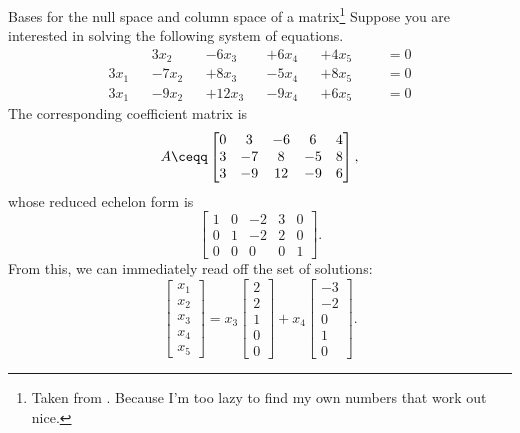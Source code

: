\begin{exm}{Bases for the null space and column space of a matrix}{}\footnote{Taken from \cite{Lay}.  Because I'm too lazy to find my own numbers that work out nice.}
	Suppose you are interested in solving the following system of equations.
	\begin{subequations}\label{eqn2.2.58}
		\begin{align}
		& & 3x_2& & -6x_3& & +6x_4& & +4x_5& & &=0 \\
		3x_1& & -7x_2& & +8x_3& & -5x_4& & +8x_5& & &=0 \\
		3x_1& & -9x_2& & +12x_3& & -9x_4& & +6x_5& & &=0
		\end{align}
	\end{subequations}
	The corresponding coefficient matrix is
	\begin{equation}
	A\ceqq \begin{bmatrix}0 & 3 & -6 & 6 & 4 \\ 3 & -7 & 8 & -5 & 8 \\ 3 & -9 & 12 & -9 & 6\end{bmatrix},
	\end{equation}
	whose reduced echelon form is
	\begin{equation}
	\begin{bmatrix}1 & 0 & -2 & 3 & 0 \\ 0 & 1 & -2 & 2 & 0 \\ 0 & 0 & 0 & 0 & 1 \end{bmatrix}.
	\end{equation}
	From this, we can immediately read off the set of solutions:
	\begin{equation}\label{eqn2.2.63}
	\begin{bmatrix}x_1 \\ x_2 \\ x_3 \\ x_4 \\ x_5\end{bmatrix}=x_3\begin{bmatrix}2 \\ 2 \\ 1 \\ 0 \\ 0\end{bmatrix}+x_4\begin{bmatrix}-3 \\ -2 \\ 0 \\ 1 \\ 0\end{bmatrix}.

\end{equation}
\end{exm}
